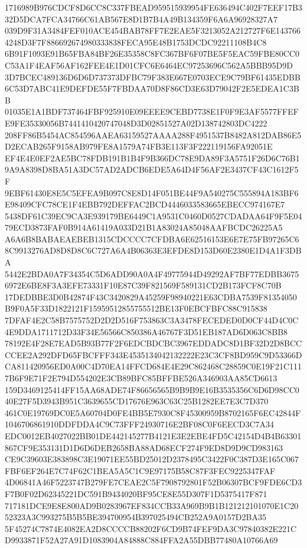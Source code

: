 \documentclass[UTF8,fontset=fandol,zihao=-4,a4paper]{ctexart}
\begin{document}
{{1716989B976CDCF8D6CC8C337FBEAD959515939954FE636494C402F7EEF17B332D5DCA7FCA34766C61AB567E8D1B7B4A49B134359F6A6A96928327A7
039D9F31A3484FEF010ACE454BAB78FF7E2EAE5F3213052A212727F6E1437664248D3F7F886692674980333838FECA95E48B1753DCDC92211108B4C8
6B91F1093E91B65FBA84BF26E35358C8FC367BF6F07BE5F5EAC59FBE80CC0C53A1F4EAF56AF162FEE4E1D01CFC6E6464EC97253696C562A5BBB95D9D
3D7BCEC489136D6D6D737373DFBC79F383E667E0703ECE9C79BF61435EDBB6C53D7ABC41E9DEFDE55F7FBDAA70D8F86CD3E63D79042F2E5EDEA1C3BB
01035E1A1BDF737464FBF925910E09EEEE9CEBD7738E1F0F9E3AF5577FFEFE9FE35330056B7441410420747048D3D02851527A02D138742803DC4222
208FF86B5454AC854596AAEA63159527AAAA288F4951537B8482A812DAB86E5D2ECAB265F9158AB979FE8A1579A74FB3E113F3F222119156FA92051E
EF4E4E0EF2AE5BC78FDB191B1B4F9B366DC78E9DA89F3A5751F26D6C76B19A9A8398D8BA51A3DC57AD2ADCB6EDE5A64D4F56AF2E3437CF43C1612F5F
9EBF61430E8E5C5EFEA9B097C8E8D14F051BE44F9A540275C555894A183BF6E98409CFC78CE1F4EBB792DEFFAC2BCD4446033583665EBECC974167E7
5438DF61C39EC9CA3E939179BE6449C1A9531C0460D0527CDADAA64F9F5E0479ECD3873FAF0B914A61419A033D21B1A83024A85048AAFBCDC26225A5
A6A6B8BABAEAEBEB1315CDCCCC7CFDBA6E62516153E6E7E75FB97265C68C9913276AD8D8D8C6C727A6A4B06363E3EFDE8D153D60E2380E1D4A1F3DBA
5442E2BDA0A7F34354C5D6ADD90A0A4F49775944D49292AF7BF77EDBB36756972E6BE8F3A3EFE73331F10E87C39F821569F589131CD2B173FCF8C70B
17DEDBBE3D0B42874F43C3420829A45259F98940221E63CDBA7539F81354050B9F0A5F33D1822121F15959512855755512BE13F0EBCFBFC88C915838
7DFAF4E2C58B7575752D2D2D516F753863C3A3478FECEDED0D0CF44D4C0C4E9DDA1711712D33F34E56566C850386A46767F3D51EB187AD6D063C8BB8
78192E4F28E7EAD5B93B77F2F6EDCBDCBC3967EDDADC8D1BF32D2D8BCCCCEE2A292DFD65FBCFFF343E4535134042132222E23C3CF8BD959C9D53366D
CA811420956ED0A00C4D70EA14FFCD684E4E29C862468C28859C0E19F21C1117B6F9E71F2E794D554202E3CB89BFC85BFFBE526A346903AA85CD6613
159D3469125414FF15AA68ADE74F86656565B9B9B9E16B3535356C6D6D98CC040E27F5D3943B951C3639655CD17676E963C63C25B1282EE7E3C7D370
461C0E19769DC0E5A60704D0FE4BB5E7930C8F45300959B8702165F6EC42844F1046706861910DDFDDA4C9C73FFF24930716E2BF08C0F6EECD3C7A34
EDC0012EB4027022BB01DE442145277B4121E3E2EBE4FD5C42154D4B4B63301867CF9E353131D1D6D6DEB2658BA88AD68ECF274F9ED8D9D9CD983163
CE9C39603E383898C3E19071EE55BD25012D2378495C3422F0C387D3E165C067FBF6EF264E7C74F62C1BEA5A5C1C9E97175B58C87F3FEC9225347FAF
4D06841A46F5223747B279FE7CEAE2C5F7908792801F52B06307BCF9FDE6CD3F7B0F02D62345221DC591B9434020BF95CE8E55D307F1D5375417F871
717181DCE9E8E800AD9B0283967EF834CCB33A969B9B1B121212101070E1C2052323A3C993275B5B5BE394700954B397025494CB252A9A0157D2BA35
5F45274C7874E4082EA2D8CCCCB88202F6CD9B74FEF9DA3C97840382E221CD9933871F52A27A91D1083904A84888C884FFA2A55DBB77480A10766A69
}}
\end{document}
